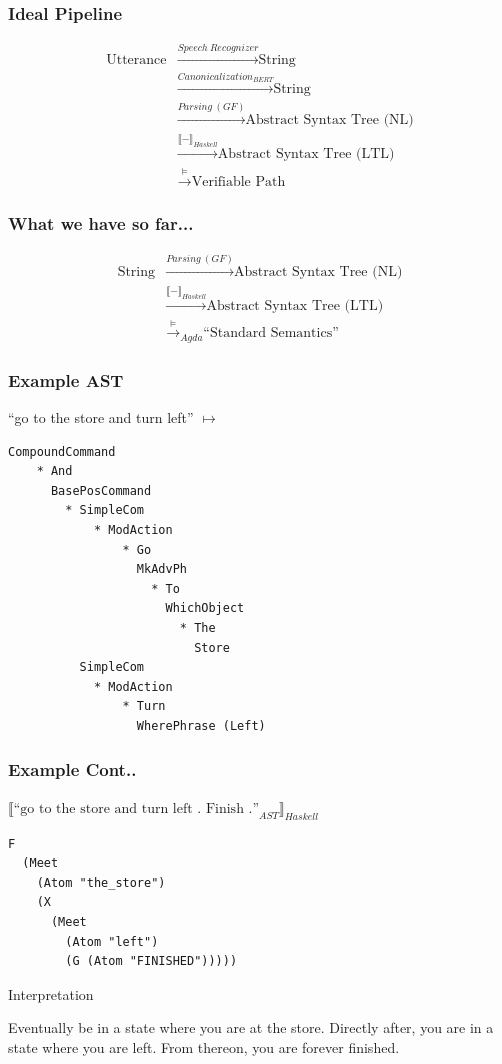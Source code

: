 \documentclass{beamer}
\begin{document}
\begin{frame}
\frametitle{Ideal Pipeline}

\begin{equation} %
\begin{split}
\text{Utterance} & \xrightarrow{\mathit{Speech\ Recognizer}} \text{String}\\
 & \xrightarrow{\mathit{Canonicalization_{BERT}}} \text{String}\\
 & \xrightarrow{\mathit{Parsing\ (GF)}} \text{Abstract Syntax Tree (NL)}\\
 & \xrightarrow{\llbracket - \rrbracket_{Haskell}} \text{Abstract Syntax Tree (LTL)}\\
 & \xrightarrow{\vDash} \text{Verifiable Path}
\end{split}
\end{equation} 
\end{frame}

\begin{frame}
\frametitle{What we have so far...}

\begin{equation} %
\begin{split}
\text{String} & \xrightarrow{\mathit{Parsing\ (GF)}} \text{Abstract Syntax Tree (NL)}\\
 & \xrightarrow{\llbracket - \rrbracket_{Haskell}} \text{Abstract Syntax Tree (LTL)}\\
 & \xrightarrow{\vDash}_{Agda} \text{``Standard Semantics''}
\end{split}
\end{equation} 
\end{frame}


\begin{frame}[fragile]
\frametitle{Example AST}
``go to the store and turn left'' $\mapsto$
\begin{verbatim}
CompoundCommand
    * And
      BasePosCommand
        * SimpleCom
            * ModAction
                * Go
                  MkAdvPh
                    * To
                      WhichObject
                        * The
                          Store
          SimpleCom
            * ModAction
                * Turn
                  WherePhrase (Left)
\end{verbatim}
\end{frame}

\begin{frame}[fragile]
\frametitle{Example Cont..}
${\llbracket  \text{``go to the store and turn left . Finish .''}_{AST} \rrbracket_{Haskell}}$
\begin{verbatim}
F
  (Meet
    (Atom "the_store") 
    (X 
      (Meet 
        (Atom "left") 
        (G (Atom "FINISHED")))))
\end{verbatim}

\begin{exampleblock}{Interpretation}
  
Eventually be in a state where you are at the store. Directly after, you are in
a state where you are left. From thereon, you are forever finished.

\end{exampleblock}
\end{frame}
\end{document}
